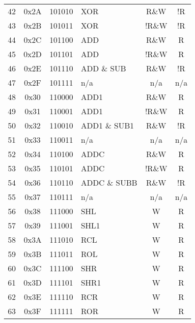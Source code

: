 \documentclass[oneside, a4paper]{memoir}
\begin{document}
\begin{center}
\begin{longtable}{ccclcc}
42 & 0x2A & 101010 & XOR             & R\&W  & !R  \\
43 & 0x2B & 101011 & XOR             & !R\&W & !R  \\
44 & 0x2C & 101100 & ADD             & R\&W  & R   \\
45 & 0x2D & 101101 & ADD             & !R\&W & R   \\
46 & 0x2E & 101110 & ADD   \& SUB    & R\&W  & !R  \\
47 & 0x2F & 101111 & n/a             & n/a   & n/a \\
48 & 0x30 & 110000 & ADD1            & R\&W  & R   \\
49 & 0x31 & 110001 & ADD1            & !R\&W & R   \\
50 & 0x32 & 110010 & ADD1  \& SUB1   & R\&W  & !R  \\
51 & 0x33 & 110011 & n/a             & n/a   & n/a \\
52 & 0x34 & 110100 & ADDC            & R\&W  & R   \\
53 & 0x35 & 110101 & ADDC            & !R\&W & R   \\
54 & 0x36 & 110110 & ADDC  \& SUBB   & R\&W  & !R  \\
55 & 0x37 & 110111 & n/a             & n/a   & n/a \\
56 & 0x38 & 111000 & SHL             & W     & R   \\
57 & 0x39 & 111001 & SHL1            & W     & R   \\
58 & 0x3A & 111010 & RCL             & W     & R   \\
59 & 0x3B & 111011 & ROL             & W     & R   \\
60 & 0x3C & 111100 & SHR             & W     & R   \\
61 & 0x3D & 111101 & SHR1            & W     & R   \\
62 & 0x3E & 111110 & RCR             & W     & R   \\
63 & 0x3F & 111111 & ROR             & W     & R   \\
\end{longtable}
\end{center}
\end{document}
